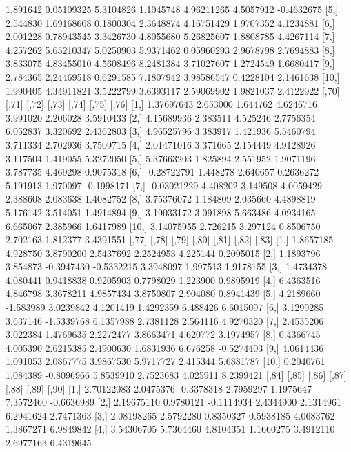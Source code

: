 \documentclass[12pt]{article}
\begin{document}
\begin{Schunk}
\begin{Soutput}
 [4,] 1.891642  0.05109325 5.3104826 1.1045748 4.96211265 4.5057912 -0.4632675
 [5,] 2.544830  1.69168608 0.1800304 2.3648874 4.16751429 1.9707352  4.1234881
 [6,] 2.001228  0.78943545 3.3426730 4.8055680 5.26825607 1.8808785  4.4267114
 [7,] 4.257262  5.65210347 5.0250903 5.9371462 0.05960293 2.9678798  2.7694883
 [8,] 3.833075  4.83455010 4.5608496 8.2481384 3.71027607 1.2724549  1.6680417
 [9,] 2.784365  2.24469518 0.6291585 7.1807942 3.98586547 0.4228104  2.1461638
[10,] 1.990405  4.34911821 3.5222799 3.6393117 2.59069902 1.9821037  2.4122922
            [,70]    [,71]    [,72]     [,73]    [,74]    [,75]      [,76]
 [1,]  1.37697643 2.653000 1.644762 4.6246716 3.991020 2.206028  3.5910433
 [2,]  4.15689936 2.383511 4.525246 2.7756354 6.052837 3.320692  2.4362803
 [3,]  4.96525796 3.383917 1.421936 5.5460794 3.711334 2.702936  3.7509715
 [4,]  2.01471016 3.371665 2.154449 4.9128926 3.117504 1.419055  5.3272050
 [5,]  5.37663203 1.825894 2.551952 1.9071196 3.787735 4.469298  0.9075318
 [6,] -0.28722791 1.448278 2.640657 0.2636272 5.191913 1.970097 -0.1998171
 [7,] -0.03021229 4.408202 3.149508 4.0059429 2.388608 2.083638  1.4082752
 [8,]  3.75376072 1.184809 2.035660 4.4898819 5.176142 3.514051  1.4914894
 [9,]  3.19033172 3.091898 5.663486 4.0934165 6.665067 2.385966  1.6417989
[10,]  3.14075955 2.726215 3.297124 0.8506750 2.702163 1.812377  3.4391551
          [,77]     [,78]      [,79]      [,80]     [,81]    [,82]      [,83]
 [1,] 1.8657185  4.928750  3.8790200  2.5437692 2.2524953 4.225144  0.2095015
 [2,] 1.1893796  3.854873 -0.3947430 -0.5332215 3.3948097 1.997513  1.9178155
 [3,] 1.4734378  4.080441  0.9418838  0.9205903 0.7798029 1.223900  0.9895919
 [4,] 6.4363516  4.846798  3.3678211  4.9857434 3.8750807 2.904080  0.8941439
 [5,] 4.2189660 -1.583989  3.0239842  4.1201419 1.4292359 6.488426  6.6015097
 [6,] 3.1299285  3.637146 -1.5339768  6.1357988 2.7381128 2.564116  4.9270320
 [7,] 2.4535206  3.022384  1.4769635  2.2272477 3.8663471 4.620772  3.1974957
 [8,] 0.4366745  4.005390  2.6215385  2.4900630 1.6831936 6.676258 -0.5274403
 [9,] 4.0614436  1.091053  2.0867775  3.9867530 5.9717727 2.415344  5.6881787
[10,] 0.2040761  1.084389 -0.8096966  5.8539910 2.7523683 4.025911  8.2399421
            [,84]     [,85]      [,86]     [,87]     [,88]     [,89]      [,90]
 [1,]  2.70122083 2.0475376 -0.3378318 2.7959297 1.1975647 7.3572460 -0.6636989
 [2,]  2.19675110 0.9780121 -0.1114934 2.4344900 2.1314961 6.2941624  2.7471363
 [3,]  2.08198265 2.5792280  0.8350327 0.5938185 4.0683762 1.3867271  6.9849842
 [4,]  3.54306705 5.7364460  4.8104351 1.1660275 3.4912110 2.6977163  6.4319645

\end{Soutput}
\end{Schunk}
\end{document}
